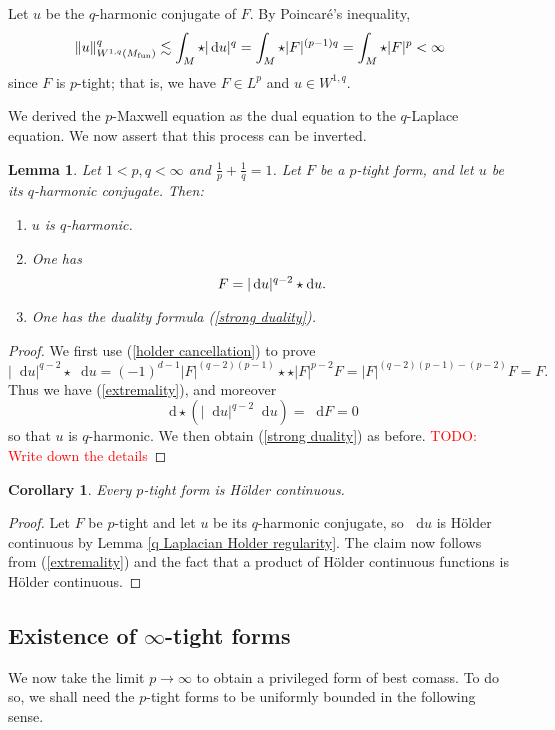 \documentclass[reqno,11pt]{amsart}
\newcommand*\dif{\mathop{}\!\mathrm{d}}
\newtheorem{lemma}[theorem]{Lemma}
\newtheorem{corollary}[theorem]{Corollary}
\theoremstyle{definition}
\numberwithin{equation}{section}
\newcommand\todo[1]{\textcolor{red}{TODO: #1}}
\begin{document}
Let $u$ be the $q$-harmonic conjugate of $F$.
By Poincar\'e's inequality,
$$\|u\|_{W^{1, q}(M_{\rm fun})}^q \lesssim \int_M \star |\dif u|^q = \int_M \star |F|^{(p - 1)q} = \int_M \star |F|^p < \infty$$
since $F$ is $p$-tight; that is, we have $F \in L^p$ and $u \in W^{1, q}$.

We derived the $p$-Maxwell equation as the dual equation to the $q$-Laplace equation.
We now assert that this process can be inverted.

\begin{lemma}
Let $1 < p, q < \infty$ and $\frac{1}{p} + \frac{1}{q} = 1$.
Let $F$ be a $p$-tight form, and let $u$ be its $q$-harmonic conjugate. Then:
\begin{enumerate}
\item $u$ is $q$-harmonic.
\item One has 
\begin{equation}
F = |\dif u|^{q - 2} \star \dif u. \label{extremality} \\
\end{equation}
\item One has the duality formula (\ref{strong duality}).
\end{enumerate}
\end{lemma}
\begin{proof}
We first use (\ref{holder cancellation}) to prove
$$|\dif u|^{q - 2} \star \dif u = (-1)^{d - 1} |F|^{(q - 2)(p - 1)} \star \star |F|^{p - 2} F = |F|^{(q - 2)(p - 1) - (p - 2)} F = F.$$
Thus we have (\ref{extremality}), and moreover
$$\dif \star (|\dif u|^{q - 2} \dif u) = \dif F = 0$$
so that $u$ is $q$-harmonic.
We then obtain (\ref{strong duality}) as before. \todo{Write down the details}
\end{proof}

\begin{corollary}
Every $p$-tight form is H\"older continuous.
\end{corollary}
\begin{proof}
Let $F$ be $p$-tight and let $u$ be its $q$-harmonic conjugate, so $\dif u$ is H\"older continuous by Lemma \ref{q Laplacian Holder regularity}.
The claim now follows from (\ref{extremality}) and the fact that a product of H\"older continuous functions is H\"older continuous.
\end{proof}


\subsection{\texorpdfstring{Existence of $\infty$-tight forms}{Existence of infinity-tight forms}}
We now take the limit $p \to \infty$ to obtain a privileged form of best comass.
To do so, we shall need the $p$-tight forms to be uniformly bounded in the following sense.
\end{document}
